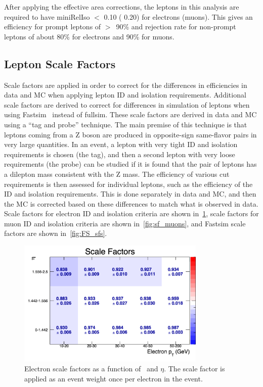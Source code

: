 After applying the effective area corrections,
the leptons in this analysis are required to have miniRelIso $<$ 0.10 ( 0.20) for electrons (muons). 
This gives an efficiency for prompt leptons of $>$~90\% and rejection rate for non-prompt leptons of about 80\% for electrons and 90\% for muons.
\clearpage

\subsection{Lepton Scale Factors}
\label{ssec:lepscalefactors}
Scale factors are applied in order to correct for the differences in efficiencies in data and MC when applying lepton ID and isolation requirements.
Additional scale factors are derived to correct for differences in simulation of leptons when using Fastsim~\cite{fastsim} instead of fullsim.
These scale factors are derived in data and MC using a ``tag and probe'' technique.
The main premise of this technique is that leptons coming from a Z boson are produced in opposite-sign same-flavor pairs in very large quantities.
In an event, a lepton with very tight ID and isolation requirements is chosen (the tag),
and then a second lepton with very loose requirements (the probe) can be studied if it is found that the pair of leptons has a dilepton mass consistent with the Z mass.
The efficiency of various cut requirements is then assessed for individual leptons, such as the efficiency of the ID and isolation requirements.
This is done separately in data and MC, and then the MC is corrected based on these differences to match what is observed in data.
Scale factors for electron ID and isolation criteria are shown in~\ref{fig:sf_electrons},
scale factors for muon ID and isolation criteria are shown in~\ref{fig:sf_muons},
and Fastsim scale factors are shown in~\ref{fig:FS_sfs}.
\begin{figure}[!ht]
  \begin{center}
      \includegraphics[width=0.8\textwidth]{evtsel/figs/sf_el_tight2d3d.pdf}  
    \caption{
      \label{fig:sf_electrons}
      Electron scale factors as a function of \pt\ and $\eta$.
      The scale factor is applied as an event weight once per electron in the event.
    }
  \end{center}
\end{figure}

